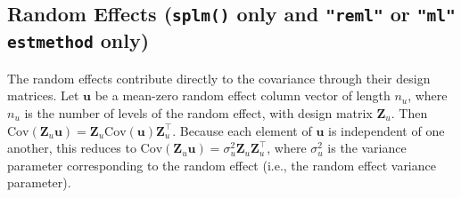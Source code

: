 \documentclass{article}
\begin{document}
\hypertarget{random-effects-splm-only-and-reml-or-ml-estmethod-only}{%
\subsection{\texorpdfstring{Random Effects (\texttt{splm()} only and
\texttt{"reml"} or \texttt{"ml"} \texttt{estmethod}
only)}{Random Effects (splm() only and "reml" or "ml" estmethod only)}}\label{random-effects-splm-only-and-reml-or-ml-estmethod-only}}

The random effects contribute directly to the covariance through their
design matrices. Let \(\mathbf{u}\) be a mean-zero random effect column
vector of length \(n_u\), where \(n_u\) is the number of levels of the
random effect, with design matrix \(\mathbf{Z}_u\). Then
\(\text{Cov}(\mathbf{Z}_u\mathbf{u}) = \mathbf{Z}_u \text{Cov}(\mathbf{u})\mathbf{Z}_u^\top\).
Because each element of \(\mathbf{u}\) is independent of one another,
this reduces to
\(\text{Cov}(\mathbf{Z}_u\mathbf{u}) = \sigma^2_u \mathbf{Z}_u \mathbf{Z}_u^\top\),
where \(\sigma^2_u\) is the variance parameter corresponding to the
random effect (i.e., the random effect variance parameter).
\end{document}

